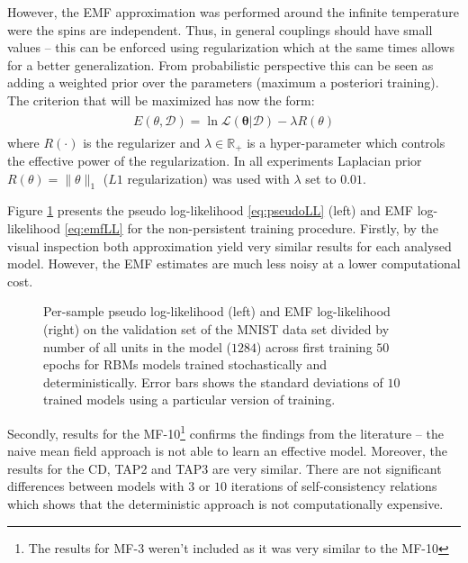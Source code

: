However, the EMF approximation was performed around the infinite temperature were the spins are independent. Thus, in general couplings should have small values -- this can be enforced using regularization which at the same times allows for a better generalization. From probabilistic perspective this can be seen as adding a weighted prior over the parameters (maximum a posteriori training). The criterion that will be maximized has now the form:
\begin{align}
\begin{split}
E(\theta, \mathcal{D}) = \ln \mathcal{L}(\mathbf{\theta}| \mathcal{D}) - \lambda R(\theta)
\end{split}
\end{align}
where $R(\cdot)$ is the regularizer and $\lambda \in \mathbb{R}_+$ is a hyper-parameter which controls the effective power of the regularization.
In all experiments Laplacian prior $R(\theta) = \| \theta \|_1$ ($L1$ regularization) was used with $\lambda$ set to $0.01$. 

Figure \ref{fig:validLL} presents the pseudo log-likelihood \ref{eq:pseudoLL} (left) and EMF log-likelihood \ref{eq:emfLL} for the non-persistent training procedure. Firstly, by the visual inspection both approximation yield very similar results for each analysed model. However, the EMF estimates are much less noisy at a lower computational cost.

\begin{figure}[!htb]
%
\endminipage 
{}  
\endminipage\hfill
  \caption[1]{Per-sample pseudo log-likelihood (left) and EMF log-likelihood (right) on the validation set of the MNIST data set divided by number of all units in the model ($1284$) across first training $50$ epochs for RBMs models trained stochastically and deterministically. Error bars shows the standard deviations of $10$ trained models using a particular version of training.}
   \label{fig:validLL}
\end{figure}
Secondly, results for the MF-10\footnote{The results for MF-3 weren't included as it was very similar to the MF-10} confirms the findings from the literature -- the naive mean field approach is not able to learn an effective model. Moreover, the results for the CD, TAP2 and TAP3 are very similar. There are not significant differences between models with $3$ or $10$ iterations of self-consistency relations which shows that the deterministic approach is not computationally expensive. 

